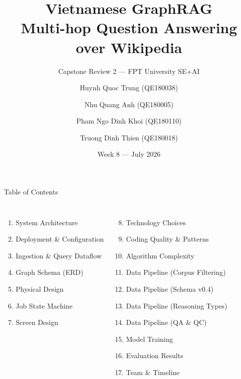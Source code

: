\documentclass[aspectratio=169]{beamer}
\title[Vietnamese GraphRAG --- Multi-hop QA]{Vietnamese GraphRAG\\Multi-hop Question Answering over Wikipedia}
\subtitle{Capstone Review 2 --- FPT University SE+AI}
\author[Trung, Anh, Khoi, Thien]{%
  Huynh Quoc Trung (QE180038) \and
  Nhu Quang Anh (QE180005) \and
  Pham Ngo Dinh Khoi (QE180110) \and
  Truong Dinh Thien (QE180018)
}
\institute{FPT University\\[4pt]\small\textit{Supervisors:} Lê Trung Hiếu \quad Đặng Nguyên Bình}
\date{Week 8 --- July 2026}
\begin{document}
\begin{frame}[plain]
\titlepage
\end{frame}

\begin{frame}{Table of Contents}
\begin{columns}[T]
\begin{enumerate}
  \item System Architecture
  \item Deployment \& Configuration
  \item Ingestion \& Query Dataflow
  \item Graph Schema (ERD)
  \item Physical Design
  \item Job State Machine
  \item Screen Design
\end{enumerate}
\begin{enumerate}
  \setcounter{enumi}{7}
  \item Technology Choices
  \item Coding Quality \& Patterns
  \item Algorithm Complexity
  \item Data Pipeline (Corpus Filtering)
  \item Data Pipeline (Schema v0.4)
  \item Data Pipeline (Reasoning Types)
  \item Data Pipeline (QA \& QC)
  \item Model Training
  \item Evaluation Results
  \item Team \& Timeline
\end{enumerate}
\end{columns}
\end{frame}
\end{document}
